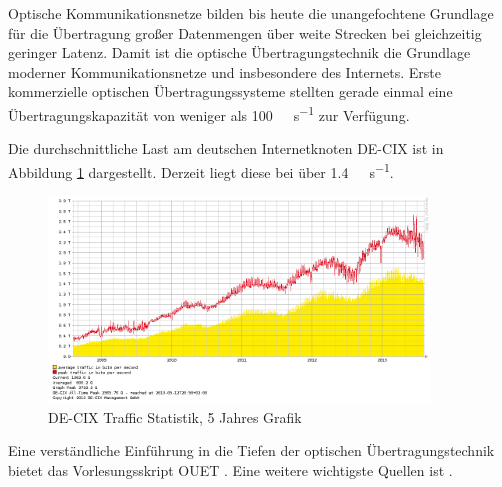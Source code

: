 \iffalse



Optische Kommunikationsnetze bilden bis heute die unangefochtene Grundlage für die Übertragung großer Datenmengen über weite Strecken bei gleichzeitig geringer Latenz.
Damit ist die optische Übertragungstechnik die Grundlage moderner Kommunikationsnetze und insbesondere des Internets.
Erste kommerzielle optischen Übertragungssysteme stellten gerade einmal eine Übertragungskapazität von weniger als \SI{100}{\mega\bit\per\second} zur Verfügung.\par\medskip
Die durchschnittliche Last am deutschen Internetknoten DE-CIX ist in Abbildung \ref{fig:DE-CIX} dargestellt. Derzeit liegt diese bei über \SI{1,4}{\tera\bit\per\second}.

\begin{figure}[ht!]
 \centering
 \includegraphics[keepaspectratio,width=0.9\textwidth]{abbildungen/de-cix_5y_20130804.png}
 \caption{DE-CIX Traffic Statistik, 5 Jahres Grafik \protect\footnotemark[1]}
 \label{fig:DE-CIX}
\end{figure}


Eine verständliche Einführung in die Tiefen der optischen Übertragungstechnik bietet das Vorlesungsskript OUET \cite{ouet}.
Eine weitere wichtigste Quellen ist \cite{Agrawal2012}.



